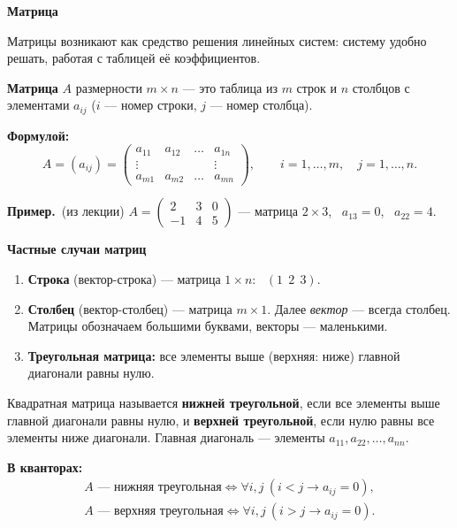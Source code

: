 \documentclass[a4paper,11pt]{article}
\newcommand{\kv}{\par\noindent\textbf{\textcolor{oprc!85!black}{В кванторах:}}}
\newcommand{\fm}{\par\noindent\textbf{\textcolor{oprc!85!black}{Формулой:}}}
\newcommand{\prim}{\par\smallskip\noindent\textbf{\textcolor{teoc!80!black}{Пример.}}\ }
\newcommand{\podr}[1]{\par\needspace{8\baselineskip}\medskip
  {\large\bfseries\textcolor{oprc!80!black}{#1}}\par\nopagebreak\smallskip}
\begin{document}
\podr{Матрица}

Матрицы возникают как средство решения линейных систем: систему удобно решать, работая с таблицей её коэффициентов.

\begin{opr}[матрица]
\textbf{Матрица} $A$ размерности $m \times n$ --- это таблица из $m$ строк и $n$ столбцов с элементами $a_{ij}$
($i$ --- номер строки, $j$ --- номер столбца).
\fm
\[
  A = (a_{ij}) = \begin{pmatrix} a_{11} & a_{12} & \dots & a_{1n} \\ \vdots & & & \vdots \\ a_{m1} & a_{m2} & \dots & a_{mn} \end{pmatrix},
  \qquad i = 1, \dots, m, \quad j = 1, \dots, n.
\]
\end{opr}

\prim (из лекции) $A = \begin{pmatrix} 2 & 3 & 0 \\ -1 & 4 & 5 \end{pmatrix}$ --- матрица $2 \times 3$, \ $a_{13} = 0$, \ $a_{22} = 4$.

\podr{Частные случаи матриц}

\begin{enumerate}[leftmargin=*]
  \item \textbf{Строка} (вектор-строка) --- матрица $1 \times n$: \ $(1\ \ 2\ \ 3)$.
  \item \textbf{Столбец} (вектор-столбец) --- матрица $m \times 1$. Далее \emph{вектор} --- всегда столбец.
        Матрицы обозначаем большими буквами, векторы --- маленькими.
  \item \textbf{Треугольная матрица:} все элементы выше (верхняя: ниже) главной диагонали равны нулю.
\end{enumerate}

\begin{opr}
Квадратная матрица называется \textbf{нижней треугольной}, если все элементы выше главной диагонали равны нулю,
и \textbf{верхней треугольной}, если нулю равны все элементы ниже диагонали.
Главная диагональ --- элементы $a_{11}, a_{22}, \dots, a_{nn}$.
\kv
\begin{gather*}
  A \text{ --- нижняя треугольная} \Leftrightarrow \forall i, j\ (i < j \to a_{ij} = 0), \\
  A \text{ --- верхняя треугольная} \Leftrightarrow \forall i, j\ (i > j \to a_{ij} = 0).
\end{gather*}
\end{opr}
\end{document}

